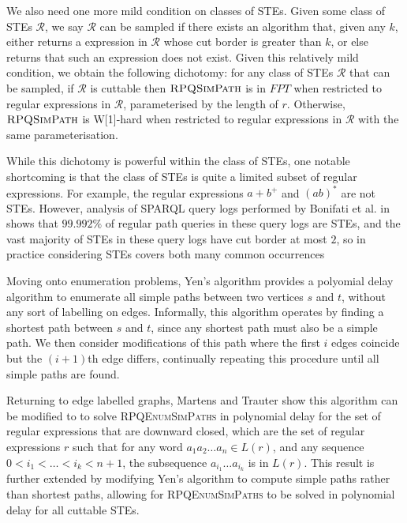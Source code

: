 \documentclass{article}
\begin{document}
We also need one more mild condition on classes of STEs. Given some class of STEs $\mathcal{R}$, we say $\mathcal{R}$ can be sampled if there exists an algorithm that, given any $k$, either returns a expression in $\mathcal{R}$ whose cut border is greater than $k$, or else returns that such an expression does not exist. Given this relatively mild condition, we obtain the following dichotomy: for any class of STEs $\mathcal{R}$ that can be sampled, if $\mathcal{R}$ is cuttable then $\textsc{RPQSimPath}$ is in $FPT$ when restricted to regular expressions in $\mathcal{R}$, parameterised by the length of $r$. Otherwise, $\textsc{RPQSimPath}$ is W[1]-hard when restricted to regular expressions in $\mathcal{R}$ with the same parameterisation.

While this dichotomy is powerful within the class of STEs, one notable shortcoming is that the class of STEs is quite a limited subset of regular expressions. For example, the regular expressions $a + b^+$ and $(ab)^*$ are not STEs. However, analysis of SPARQL query logs performed by Bonifati et al. in \cite{bonifatiAnalyticalStudyLarge2020} shows that $99.992\%$ of regular path queries in these query logs are STEs, and the vast majority of STEs in these query logs have cut border at most $2$, so in practice considering STEs covers both many common occurrences

Moving onto enumeration problems, Yen's algorithm \cite{yenFindingShortestLoopless1971} provides a polyomial delay algorithm to enumerate all simple paths between two vertices $s$ and $t$, without any sort of labelling on edges. Informally, this algorithm operates by finding a shortest path between $s$ and $t$, since any shortest path must also be a simple path. We then consider modifications of this path where the first $i$ edges coincide but the $(i+1)$th edge differs, continually repeating this procedure until all simple paths are found.

Returning to edge labelled graphs, Martens and Trauter show this algorithm can be modified to to solve \textsc{RPQEnumSimPaths} in polynomial delay for the set of regular expressions that are downward closed, which are the set of regular expressions $r$ such that for any word $a_1 a_2 \dots a_n \in L(r)$, and any sequence $0 < i_1 < \dots < i_k < n + 1$, the subsequence $a_{i_1} \dots a_{i_k}$ is in $L(r)$. This result is further extended by modifying Yen's algorithm to compute simple paths rather than shortest paths, allowing for \textsc{RPQEnumSimPaths} to be solved in polynomial delay for all cuttable STEs.
\end{document}
